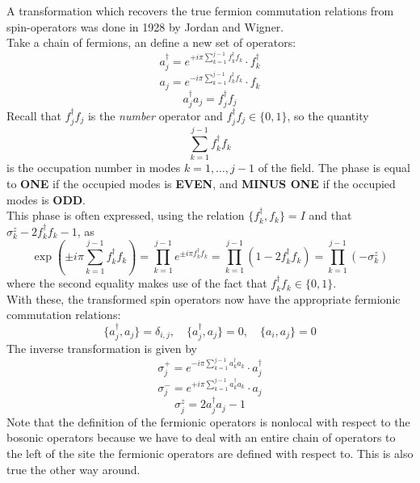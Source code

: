 \documentclass{book}
\theoremstyle{definition}
\newcommand{\lp}{\left(}
\newcommand{\rp}{\right)}
\begin{document}
A transformation which recovers the true fermion commutation relations from spin-operators was done in 1928 by Jordan and Wigner. \\

Take a chain of fermions, an define a new set of operators:
\begin{equation}
\boxed{a_j^\dagger = e^{+i\pi \sum^{j-1}_{k=1} f_k^\dagger f_k} \cdot f_k^\dagger }
\end{equation}
\begin{equation}
\boxed{a_j = e^{-i\pi \sum^{j-1}_{k=1} f_k^\dagger f_k} \cdot f_k }
\end{equation}
\begin{equation}
\boxed{a_j^\dagger a_j =  f_j^\dagger f_j}
\end{equation}
Recall that $f_j^\dagger f_j$ is the \textit{number} operator and $f_j^\dagger f_j \in \{ 0,1\}$, so the quantity 
\begin{equation}
\sum^{j-1}_{k=1} f_k^\dagger f_k
\end{equation}
is the occupation number in modes $k=1,\dots,j-1$ of the field. The phase is equal to \textbf{ONE} if the occupied modes is \textbf{EVEN}, and \textbf{MINUS ONE} if the occupied modes is \textbf{ODD}. \\

This phase is often expressed, using the relation $\{ f_k^\dagger,f_k\} = I$ and that $\sigma^z_k - 2f_k^\dagger f_k - 1$, as
\begin{equation}
\exp\lp \pm i\pi \sum_{k=1}^{j-1} f_k^\dagger f_k \rp = \prod^{j-1}_{k=1} e^{\pm i\pi f_k^\dagger f_k } = \prod^{j-1}_{k=1} (1-2f_k^\dagger f_k) = \prod^{j-1}_{k=1}(-\sigma^z_k)
\end{equation}
where the second equality makes use of the fact that $f_k^\dagger f_k \in \{ 0,1 \}$. \\

With these, the transformed spin operators now have the appropriate fermionic commutation relations:
\begin{equation}
\boxed{\{ a_j^\dagger, a_j\} = \delta_{i,j}, \quad \{a_j^\dagger,a_j \} =0,\quad \{ a_i,a_j \} = 0}
\end{equation}
The inverse transformation is given by
\begin{equation}
\boxed{\sigma_j^+ = e^{-i\pi \sum^{j-1}_{k=1} a_k^\dagger a_k} \cdot a_j^\dagger}
\end{equation}
\begin{equation}
\boxed{\sigma_j^- = e^{+i\pi \sum^{j-1}_{k=1} a_k^\dagger a_k} \cdot a_j}
\end{equation}
\begin{equation}
\boxed{\sigma_j^z = 2a_j^\dagger a_j -1}
\end{equation}
Note that the definition of the fermionic operators is nonlocal with respect to the bosonic operators because we have to deal with an entire chain of operators to the left of the site the fermionic operators are defined with respect to. This is also true the other way around. 
\end{document}
